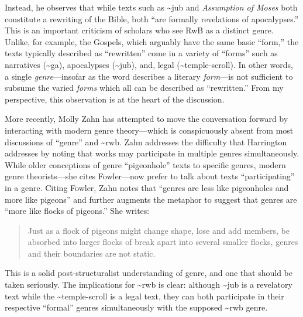 Instead, he observes that while texts such as \textasciitilde{}jub and
\emph{Assumption of Moses} both constitute a rewriting of the Bible,
both ``are formally revelations of
apocalypses.''\autocite[243]{harrington_kraft-nickelsburg1986} This is
an important criticism of scholars who see RwB as a distinct genre.
Unlike, for example, the Gospels, which arguably have the same basic
``form,'' the texts typically described as ``rewritten'' come in a
variety of ``forms'' such as narratives (\textasciitilde{}ga),
apocalypses (\textasciitilde{}jub), and, legal
(\textasciitilde{}temple-scroll). In other words, a single
\emph{genre}---insofar as the word describes a literary \emph{form}---is
not sufficient to subsume the varied \emph{forms} which all can be
described as ``rewritten.'' From my perspective, this observation is at
the heart of the discussion.

More recently, Molly Zahn has attempted to move the conversation forward
by interacting with modern genre theory---which is conspicuously absent
from most discussions of ``genre'' and
\textasciitilde{}rwb.\autocites{zahn_jbl2012}[Daniel Machiela noted the
absence of genre theory in his 2010 article, as well,
see][]{machiela_jjs2010}[Notable exceptions include][]{brooke_dsd2010}
Zahn addresses the difficulty that Harrington addresses by noting that
works may participate in multiple genres simultaneously. While older
conceptions of genre ``pigeonhole'' texts to specific genres, modern
genre theorists---she cites Fowler---now prefer to talk about texts
``participating'' in a genre. Citing Fowler, Zahn notes that ``genres
are less like pigeonholes and more like pigeons'' and further augments
the metaphor to suggest that genres are ``more like flocks of pigeons.''
She writes:

\begin{quote}
Just as a flock of pigeons might change shape, lose and add members, be
absorbed into larger flocks of break apart into several smaller flocks,
genres and their boundaries are not static.\autocite[277]{zahn_jbl2012}
\end{quote}

This is a solid post-structuralist understanding of genre, and one that
should be taken seriously. The implications for \textasciitilde{}rwb is
clear: although \textasciitilde{}jub is a revelatory text while the
\textasciitilde{}temple-scroll is a legal text, they can both
participate in their respective ``formal'' genres simultaneously with
the supposed \textasciitilde{}rwb genre.\autocites[Zahn also explores
the ``functional'' aspects of genre. She notes that genres are ``not
simply systems of classifications developed and used by literary
critics, but are fundamental to all human
communication.''][280]{zahn_jbl2012}[Thus, genres manifest as common
patterns recognized by both the author and the reader which aid
communication and in this way, genre functions as a sort of ``literary
body language.''][276]{zahn_jbl2012}[See also][199]{newsom_grossman2010}

